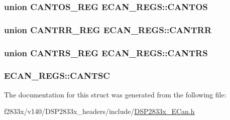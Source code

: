 \subsubsection[{C\+A\+N\+T\+O\+S}]{\setlength{\rightskip}{0pt plus 5cm}union {\bf C\+A\+N\+T\+O\+S\+\_\+\+R\+E\+G} E\+C\+A\+N\+\_\+\+R\+E\+G\+S\+::\+C\+A\+N\+T\+O\+S}\label{struct_e_c_a_n___r_e_g_s_a78d122f5120e0532b5370e6edd670314}
\hypertarget{struct_e_c_a_n___r_e_g_s_aadeb18b55adca53969eb22031e0973b2}{}
\subsubsection[{C\+A\+N\+T\+R\+R}]{\setlength{\rightskip}{0pt plus 5cm}union {\bf C\+A\+N\+T\+R\+R\+\_\+\+R\+E\+G} E\+C\+A\+N\+\_\+\+R\+E\+G\+S\+::\+C\+A\+N\+T\+R\+R}\label{struct_e_c_a_n___r_e_g_s_aadeb18b55adca53969eb22031e0973b2}
\hypertarget{struct_e_c_a_n___r_e_g_s_af0e518a292dd9a2dd49768bb860889df}{}
\subsubsection[{C\+A\+N\+T\+R\+S}]{\setlength{\rightskip}{0pt plus 5cm}union {\bf C\+A\+N\+T\+R\+S\+\_\+\+R\+E\+G} E\+C\+A\+N\+\_\+\+R\+E\+G\+S\+::\+C\+A\+N\+T\+R\+S}\label{struct_e_c_a_n___r_e_g_s_af0e518a292dd9a2dd49768bb860889df}
\hypertarget{struct_e_c_a_n___r_e_g_s_af4fb85af8e3eda7b8f9cf582993d2993}{}
\subsubsection[{C\+A\+N\+T\+S\+C}]{ E\+C\+A\+N\+\_\+\+R\+E\+G\+S\+::\+C\+A\+N\+T\+S\+C}\label{struct_e_c_a_n___r_e_g_s_af4fb85af8e3eda7b8f9cf582993d2993}


The documentation for this struct was generated from the following file\+:\begin{DoxyCompactItemize}
\item 
f2833x/v140/\+D\+S\+P2833x\+\_\+headers/include/\hyperlink{_d_s_p2833x___e_can_8h}{D\+S\+P2833x\+\_\+\+E\+Can.\+h}\end{DoxyCompactItemize}
